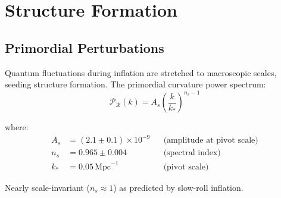 \section{Structure Formation}

\subsection{Primordial Perturbations}

\begin{defn}\label{def:primordial-power}
Quantum fluctuations during inflation are stretched to macroscopic scales, seeding structure formation. The primordial curvature power spectrum\cite{mukhanov2005,guth1981}:
\begin{equation}
\mathcal{P}_\mathcal{R}(k) = A_s \left( \frac{k}{k_*} \right)^{n_s - 1}
\end{equation}

where:
\begin{align}
A_s &= (2.1 \pm 0.1) \times 10^{-9} && \text{(amplitude at pivot scale)} \\
n_s &= 0.965 \pm 0.004 && \text{(spectral index)} \\
k_* &= 0.05 \, \text{Mpc}^{-1} && \text{(pivot scale)}
\end{align}

Nearly scale-invariant ($n_s \approx 1$) as predicted by slow-roll inflation.
\end{defn}

